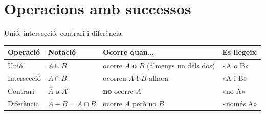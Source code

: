 \documentclass[11pt,a4paper]{article}
\begin{document}
\section{Operacions amb successos}\hypertarget{sec2}{}

\begin{fmdef}{Unió, intersecció, contrari i diferència}
\begin{center}\renewcommand{\arraystretch}{1.5}\small\begin{tabularx}{\linewidth}{>{\raggedright\arraybackslash}p{3.2cm}>{\raggedright\arraybackslash}X>{\raggedright\arraybackslash}X>{\raggedright\arraybackslash}X}\toprule
\textbf{Operació} & \textbf{Notació} & \textbf{Ocorre quan\dots{}} & \textbf{Es llegeix}\\\midrule
Unió & $A\cup B$ & ocorre $A$ \textbf{o} $B$ (almenys un dels dos) & «A o B»\\[3pt]
Intersecció & $A\cap B$ & ocorren $A$ \textbf{i} $B$ alhora & «A i B»\\[3pt]
Contrari & $\overline{A}$ o $A^c$ & \textbf{no} ocorre $A$ & «no A»\\[3pt]
Diferència & $A-B=A\cap\overline{B}$ & ocorre $A$ però no $B$ & «només A»\\[3pt]
\bottomrule\end{tabularx}\end{center}


\end{fmdef}
\end{document}
